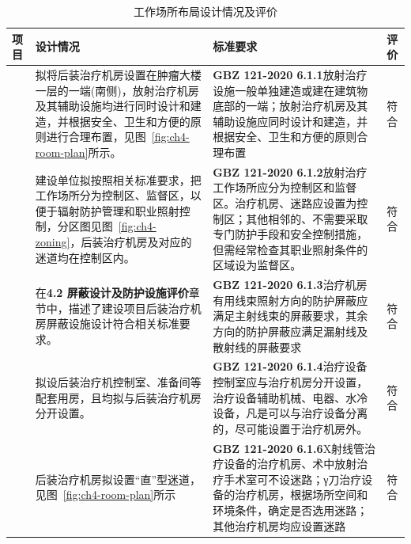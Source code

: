 \begin{table}[H]
\centering
\caption{工作场所布局设计情况及评价}
\label{tab:ch4-layout-eval}
\begin{tabular}{|
>{\centering\arraybackslash}m{2cm}|
>{\raggedright\arraybackslash}m{6cm}|
>{\raggedright\arraybackslash}m{6cm}|
>{\centering\arraybackslash}m{1cm}|
}
\hline
项目 & 设计情况 & 标准要求 & 评价 \\
\hline
\multirow{5}{=}{\centering 后装治疗机房}
& 拟将后装治疗机房设置在肿瘤大楼一层的一端(南侧)，放射治疗机房及其辅助设施均进行同时设计和建造，并根据安全、卫生和方便的原则进行合理布置，见图~\ref{fig:ch4-room-plan}所示。
& \textbf{GBZ 121-2020 6.1.1}\newline 放射治疗设施一般单独建造或建在建筑物底部的一端；放射治疗机房及其辅助设施应同时设计和建造，并根据安全、卫生和方便的原则合理布置
& 符合 \\
\cline{2-4}
& 建设单位拟按照相关标准要求，把工作场所分为控制区、监督区，以便于辐射防护管理和职业照射控制，分区图见图~\ref{fig:ch4-zoning}，后装治疗机房及对应的迷道均在控制区内。
& \textbf{GBZ 121-2020 6.1.2}\newline 放射治疗工作场所应分为控制区和监督区。治疗机房、迷路应设置为控制区；其他相邻的、不需要采取专门防护手段和安全控制措施，但需经常检查其职业照射条件的区域设为监督区。
& 符合 \\
\cline{2-4}
& 在\textbf{4.2 屏蔽设计及防护设施评价}章节中，描述了建设项目后装治疗机房屏蔽设施设计符合相关标准要求。
& \textbf{GBZ 121-2020 6.1.3}\newline 治疗机房有用线束照射方向的防护屏蔽应满足主射线束的屏蔽要求，其余方向的防护屏蔽应满足漏射线及散射线的屏蔽要求
& 符合 \\
\cline{2-4}
& 拟设后装治疗机控制室、准备间等配套用房，且均拟与后装治疗机房分开设置。
& \textbf{GBZ 121-2020 6.1.4}\newline 治疗设备控制室应与治疗机房分开设置，治疗设备辅助机械、电器、水冷设备，凡是可以与治疗设备分离的，尽可能设置于治疗机房外。
& 符合 \\
\cline{2-4}
& 后装治疗机房拟设置“直”型迷道，见图~\ref{fig:ch4-room-plan}所示
& \textbf{GBZ 121-2020 6.1.6}\newline X射线管治疗设备的治疗机房、术中放射治疗手术室可不设迷路；γ刀治疗设备的治疗机房，根据场所空间和环境条件，确定是否选用迷路；其他治疗机房均应设置迷路
& 符合 \\
\hline
\end{tabular}
\end{table}





